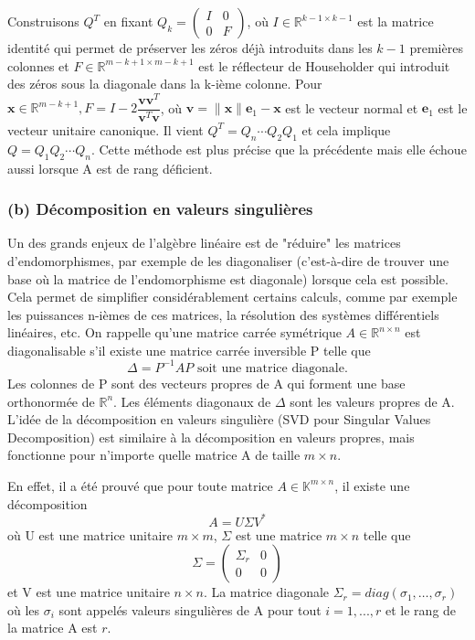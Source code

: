 \documentclass[11pt,a4paper,oneside]{book}
\def\R{\mathbb R}
\def\K{\mathbb K}
\def\v{\mathbf v}
\def\x{\mathbf x}
\newcommand{\f}[2]{\dfrac{#1}{#2}}
\newcommand{\mbf}[1]{\mathbf{#1}}
\begin{document}
Construisons $ Q^{T} $ en fixant $ Q_{k}=\begin{pmatrix}
I&0\\0&F
\end{pmatrix} $, où $ I\in\R^{k-1\times k-1} $ est la matrice identité qui
permet de préserver les zéros déjà introduits dans les $ k - 1 $ premières colonnes et $ F\in\R^{m-k+1\times m-k+1} $ est le réflecteur de Householder qui introduit des zéros sous la diagonale dans la k-ième colonne. Pour $ \x\in\R^{m-k+1}, F=I-2\f{\v\v^{T}}{\v^{T}\v} $, où $ \v=\parallel\x\parallel\mbf{e}_{1}-\x $ est le vecteur normal et $ \mbf{e}_{1} $ est le vecteur unitaire canonique. Il vient $ Q^{T} = Q_{n}\cdots Q_{2}Q_{1} $ et cela implique $ Q = Q_{1}Q_{2}\cdots Q_{n} $. Cette méthode est plus précise que la précédente mais elle échoue aussi lorsque A est de rang déficient.
\subsubsection*{(b) Décomposition en valeurs singulières}
Un des grands enjeux de l'algèbre linéaire est de "réduire" les matrices d'endomorphismes,
par exemple de les diagonaliser (c'est-à-dire de trouver une base où la matrice de l'endomorphisme
est diagonale) lorsque cela est possible. Cela permet de simplifier considérablement
certains calculs, comme par exemple les puissances n-ièmes de ces matrices, la résolution des systèmes différentiels linéaires, etc. On rappelle qu'une matrice carrée symétrique $ A\in\R^{n\times n}$ est diagonalisable s'il existe  une matrice carrée inversible P telle que
\begin{equation}\label{diag}
\Delta=P^{-1}AP \text{ soit une matrice diagonale}.
\end{equation}
Les colonnes de P sont des vecteurs propres de A qui forment une base orthonormée
de $ \R^{n} $. Les éléments diagonaux de $ \Delta $ sont
les valeurs propres de A. L’idée de la décomposition en valeurs singulière (SVD pour Singular Values Decomposition) est similaire à la décomposition en
valeurs propres, mais fonctionne pour n’importe quelle matrice A de taille $ m\times n $.

En effet, il a été prouvé que pour toute matrice $ A\in\K^{m\times n} $, il existe une décomposition
\begin{equation}
A=U\Sigma V^{*}
\end{equation}
 où U est une matrice unitaire $ m\times m $, $ \Sigma $ est une matrice $ m\times n $ telle que $$ \Sigma=\begin{pmatrix}
 \Sigma_{r}&0\\ 0&0
 \end{pmatrix} $$ et
V est une matrice unitaire $ n \times n $. La matrice diagonale $ \Sigma_{r}=diag(\sigma_{1},\dots,\sigma_{r}) $ où les $ \sigma_{i} $ sont appelés valeurs singulières de A pour tout $ i = 1,...,r $ et le rang de la matrice A est $ r $.
\end{document}
